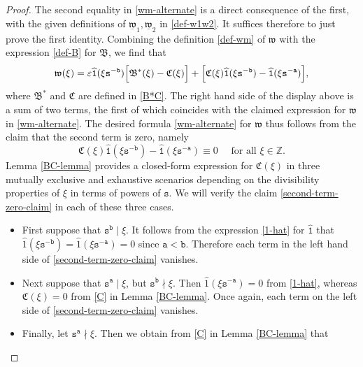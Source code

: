 \documentclass[12pt, twoside]{article}
\theoremstyle{definition}
\numberwithin{equation}{section}
\begin{document}
\begin{proof} 
The second equality in \eqref{wm-alternate} is a direct consequence of the first, with the given definitions of $\underline{\mathfrak w}_1, \underline{\mathfrak w}_2$ in \eqref{def-w1w2}. It suffices therefore to just prove the first identity. Combining the definition \eqref{def-wm} of $\mathfrak w$ with the expression \eqref{def-B} for $\mathfrak B$, we find that 
\[ \mathfrak w(\xi) = \varepsilon \widehat{\mathtt 1}(\xi \mathtt s^{-\mathtt b}) \Bigl[ \mathfrak B^{\ast}(\xi) - \mathfrak C(\xi) \Bigr] + \Bigl[ \mathfrak C(\xi) \widehat{\mathtt 1}(\xi \mathtt s^{-\mathtt b}) - \widehat{\mathtt 1}(\xi \mathtt s^{-\mathtt a})\Bigr], \]
where $\mathfrak B^{\ast}$ and $\mathfrak C$ are defined in \eqref{B*C}. The right hand side of the display above is a sum of two terms, the first of which coincides with the claimed expression for $\mathfrak w$ in \eqref{wm-alternate}. The desired formula \eqref{wm-alternate} for $\mathfrak w$ thus follows from the claim that the second term is zero, namely
\begin{equation} 
\mathfrak C(\xi) \widehat{\mathtt 1}(\xi \mathtt s^{-\mathtt b}) - \widehat{\mathtt 1}(\xi \mathtt s^{-\mathtt a}) \equiv 0 \quad \text{ for all } \xi \in \mathbb Z.  \label{second-term-zero-claim}
\end{equation}
\noindent Lemma \ref{BC-lemma} provides a closed-form expression for $\mathfrak C(\xi)$ in three mutually exclusive and exhaustive scenarios depending on the divisibility properties of $\xi$ in terms of powers of $\mathtt s$.  
We will verify the claim \eqref{second-term-zero-claim} in each of these three cases. 
\begin{itemize} 
\item First suppose that $\mathtt s^{\mathtt b} \mid \xi$. It follows from the expression \eqref{1-hat} for $\widehat{\mathtt 1}$ that $\widehat{1}(\xi \mathtt s^{-\mathtt b}) =  \widehat{1}(\xi \mathtt s^{-\mathtt a}) = 0$ since $\mathtt a < \mathtt b$. Therefore each term in the left hand side of \eqref{second-term-zero-claim} vanishes.
\item Next suppose that  $\mathtt s^{\mathtt a} \mid \xi$, but $\mathtt s^{\mathtt b} \nmid \xi$. Then $\widehat{1}(\xi \mathtt s^{-\mathtt a}) = 0$ from \eqref{1-hat}, whereas $\mathfrak C(\xi) = 0$ from \eqref{C} in Lemma \ref{BC-lemma}. Once again, each term on the left side of \eqref{second-term-zero-claim} vanishes. 
\item Finally, let $\mathtt s^{\mathtt a} \nmid \xi$. Then we obtain from \eqref{C} in Lemma \ref{BC-lemma} that

\end{itemize}
\end{proof}
\end{document}
